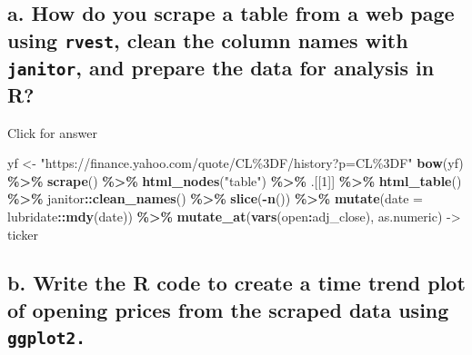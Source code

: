 \documentclass[
]{book}
\newenvironment{Shaded}{\begin{snugshade}}{\end{snugshade}}
\newcommand{\AttributeTok}[1]{\textcolor[rgb]{0.13,0.29,0.53}{#1}}
\newcommand{\DecValTok}[1]{\textcolor[rgb]{0.00,0.00,0.81}{#1}}
\newcommand{\FunctionTok}[1]{\textcolor[rgb]{0.13,0.29,0.53}{\textbf{#1}}}
\newcommand{\NormalTok}[1]{#1}
\newcommand{\OtherTok}[1]{\textcolor[rgb]{0.56,0.35,0.01}{#1}}
\newcommand{\SpecialCharTok}[1]{\textcolor[rgb]{0.81,0.36,0.00}{\textbf{#1}}}
\newcommand{\StringTok}[1]{\textcolor[rgb]{0.31,0.60,0.02}{#1}}
\begin{document}
\hypertarget{a.-how-do-you-scrape-a-table-from-a-web-page-using-rvest-clean-the-column-names-with-janitor-and-prepare-the-data-for-analysis-in-r}{%
\subsection{\texorpdfstring{a. How do you scrape a table from a web page using \texttt{rvest}, clean the column names with \texttt{janitor}, and prepare the data for analysis in R?}{a. How do you scrape a table from a web page using rvest, clean the column names with janitor, and prepare the data for analysis in R?}}\label{a.-how-do-you-scrape-a-table-from-a-web-page-using-rvest-clean-the-column-names-with-janitor-and-prepare-the-data-for-analysis-in-r}}

Click for answer

\begin{Shaded}
\begin{Highlighting}[]
\NormalTok{yf }\OtherTok{\textless{}{-}} \StringTok{"https://finance.yahoo.com/quote/CL\%3DF/history?p=CL\%3DF"}
  \FunctionTok{bow}\NormalTok{(yf) }\SpecialCharTok{\%\textgreater{}\%} \FunctionTok{scrape}\NormalTok{() }\SpecialCharTok{\%\textgreater{}\%} 
    \FunctionTok{html\_nodes}\NormalTok{(}\StringTok{"table"}\NormalTok{) }\SpecialCharTok{\%\textgreater{}\%}\NormalTok{ .[[}\DecValTok{1}\NormalTok{]] }\SpecialCharTok{\%\textgreater{}\%} 
    \FunctionTok{html\_table}\NormalTok{() }\SpecialCharTok{\%\textgreater{}\%}\NormalTok{ janitor}\SpecialCharTok{::}\FunctionTok{clean\_names}\NormalTok{() }\SpecialCharTok{\%\textgreater{}\%} 
    \FunctionTok{slice}\NormalTok{(}\SpecialCharTok{{-}}\FunctionTok{n}\NormalTok{()) }\SpecialCharTok{\%\textgreater{}\%} 
    \FunctionTok{mutate}\NormalTok{(}\AttributeTok{date =}\NormalTok{ lubridate}\SpecialCharTok{::}\FunctionTok{mdy}\NormalTok{(date)) }\SpecialCharTok{\%\textgreater{}\%} 
    \FunctionTok{mutate\_at}\NormalTok{(}\FunctionTok{vars}\NormalTok{(open}\SpecialCharTok{:}\NormalTok{adj\_close), as.numeric) }\OtherTok{{-}\textgreater{}}\NormalTok{ ticker}
\end{Highlighting}
\end{Shaded}

\hypertarget{b.-write-the-r-code-to-create-a-time-trend-plot-of-opening-prices-from-the-scraped-data-using-ggplot2.}{%
\subsection{\texorpdfstring{b. Write the R code to create a time trend plot of opening prices from the scraped data using \texttt{ggplot2.}}{b. Write the R code to create a time trend plot of opening prices from the scraped data using ggplot2.}}\label{b.-write-the-r-code-to-create-a-time-trend-plot-of-opening-prices-from-the-scraped-data-using-ggplot2.}}
\end{document}
